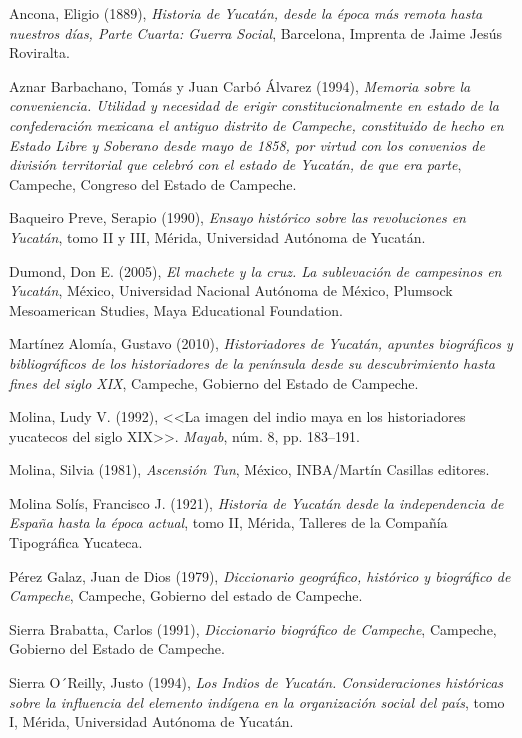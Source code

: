 Ancona, Eligio (1889), \textit{Historia de Yucatán, desde la época más
remota hasta nuestros días, Parte Cuarta: Guerra Social}, Barcelona,
Imprenta de Jaime Jesús Roviralta.

Aznar Barbachano, Tomás y Juan Carbó Álvarez (1994),
\textit{Memoria sobre la conveniencia. Utilidad y
necesidad de erigir constitucionalmente en estado de la confederación
mexicana el antiguo distrito de Campeche, constituido de hecho en Estado
Libre y Soberano desde mayo de 1858, por virtud con los convenios de
división territorial que celebró con el estado de Yucatán, de que era
parte}, Campeche, Congreso del Estado de Campeche.

Baqueiro Preve, Serapio (1990), \textit{Ensayo histórico
sobre las revoluciones en
Yucatán}, tomo II y III, Mérida, Universidad Autónoma de Yucatán.

Dumond, Don E. (2005), \textit{El machete y la cruz. La sublevación de
campesinos en Yucatán}, México, Universidad Nacional Autónoma de México,
Plumsock Mesoamerican Studies, Maya Educational Foundation.


Martínez Alomía, Gustavo (2010), \textit{Historiadores de Yucatán, apuntes
biográficos y bibliográficos de los historiadores de la península desde su
descubrimiento hasta fines del siglo XIX}, Campeche, Gobierno del Estado de
Campeche.

Molina, Ludy V. (1992),
<<La imagen del indio maya en los historiadores yucatecos del siglo
XIX>>. \textit {Mayab}, núm. 8, pp. 183--191.

Molina, Silvia (1981), \textit {Ascensión Tun}, México, INBA\slash{}Martín
Casillas editores.
\newpage

Molina Solís, Francisco J. (1921), \textit{Historia de Yucatán desde la
independencia de España hasta la época actual}, tomo II,  Mérida, Talleres de la
Compañía Tipográfica Yucateca.

Pérez Galaz, Juan de Dios (1979),
\textit {Diccionario
geográfico,  histórico y biográfico de
Campeche}, Campeche, Gobierno del estado de Campeche. 

\begin{sloppypar}
Sierra Brabatta, Carlos (1991), \textit{Diccionario biográfico de Campeche},
Campeche, Gobierno del Estado de Campeche.
\end{sloppypar}

Sierra O´Reilly, Justo (1994), \textit{Los
Indios de Yucatán. Consideraciones históricas sobre la influencia del
elemento indígena en la organización social del
país}, tomo I, Mérida, Universidad Autónoma de Yucatán.
\newpage
\thispagestyle{empty}
\phantom{abc}

